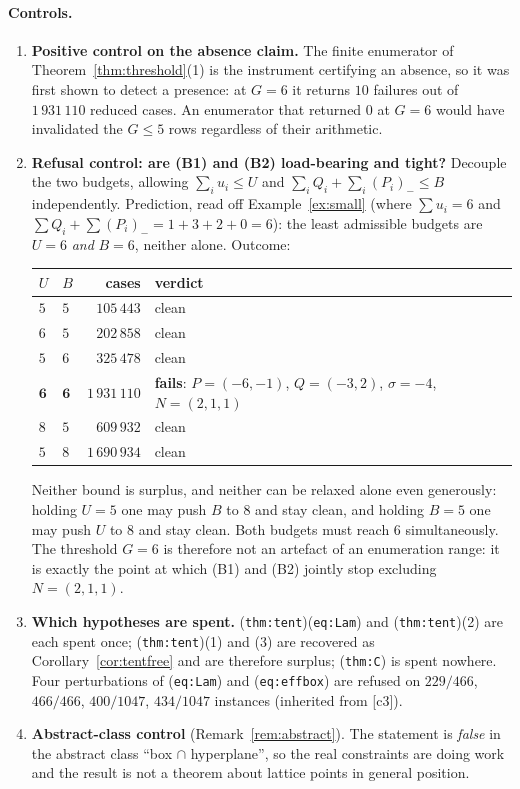 \documentclass[11pt]{article}
\theoremstyle{definition}
\newcommand{\nneg}[1]{(#1)_{-}}
\begin{document}
\paragraph{Controls.}
\begin{enumerate}
\item \textbf{Positive control on the absence claim.} The finite enumerator of
Theorem~\ref{thm:threshold}(1) is the instrument certifying an absence, so it was first
shown to detect a presence: at $G=6$ it returns $10$ failures out of $1\,931\,110$
reduced cases. An enumerator that returned $0$ at $G=6$ would have invalidated the
$G\le5$ rows regardless of their arithmetic.
\item \textbf{Refusal control: are (B1) and (B2) load-bearing and tight?} Decouple the
two budgets, allowing $\sum_iu_i\le U$ and $\sum_iQ_i+\sum_i\nneg{P_i}\le B$
independently. Prediction, read off Example~\ref{ex:small} (where $\sum u_i=6$ and
$\sum Q_i+\sum\nneg{P_i}=1+3+2+0=6$): the least admissible budgets are $U=6$
\emph{and} $B=6$, neither alone. Outcome:
\begin{center}\small
\begin{tabular}{llrl}
 $U$ & $B$ & cases & verdict\\\hline
 $5$ & $5$ & $105\,443$ & clean\\
 $6$ & $5$ & $202\,858$ & clean\\
 $5$ & $6$ & $325\,478$ & clean\\
 $\mathbf 6$ & $\mathbf 6$ & $1\,931\,110$ & \textbf{fails}: $P=(-6,-1)$, $Q=(-3,2)$, $\sigma=-4$, $N=(2,1,1)$\\
 $8$ & $5$ & $609\,932$ & clean\\
 $5$ & $8$ & $1\,690\,934$ & clean\\
\end{tabular}
\normalsize\end{center}
Neither bound is surplus, and neither can be relaxed alone even generously: holding
$U=5$ one may push $B$ to $8$ and stay clean, and holding $B=5$ one may push $U$ to $8$
and stay clean. Both budgets must reach $6$ simultaneously. The threshold $G=6$ is
therefore not an artefact of an enumeration range: it is exactly the point at which (B1)
and (B2) jointly stop excluding $N=(2,1,1)$.
\item \textbf{Which hypotheses are spent.} (\texttt{thm:tent})(\texttt{eq:Lam}) and
(\texttt{thm:tent})(2) are each spent once; (\texttt{thm:tent})(1) and (3) are recovered
as Corollary~\ref{cor:tentfree} and are therefore surplus; (\texttt{thm:C}) is spent
nowhere. Four perturbations of (\texttt{eq:Lam}) and (\texttt{eq:effbox}) are refused on
$229/466$, $466/466$, $400/1047$, $434/1047$ instances (inherited from [c3]).
\item \textbf{Abstract-class control} (Remark~\ref{rem:abstract}). The statement is
\emph{false} in the abstract class ``box $\cap$ hyperplane'', so the real constraints are
doing work and the result is not a theorem about lattice points in general position.
\end{enumerate}
\end{document}
